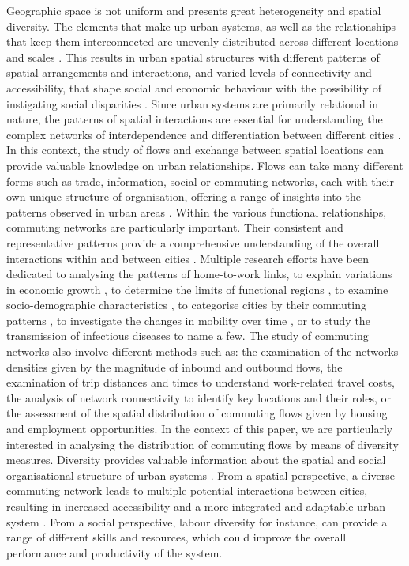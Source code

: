 \documentclass[11pt, a4paper]{article}
\begin{document}
Geographic space is not uniform and presents great heterogeneity and spatial diversity. The elements that make up urban systems, as well as the relationships that keep them interconnected are unevenly distributed across different locations and scales \citep{batty1994fractal,Bretagnolle2006, Pumain2006,Halas2014}. This results in urban spatial structures \citep{Sohn2005, Fusco2011} with different patterns of spatial arrangements and interactions, and varied levels of connectivity and accessibility, that shape social and economic behaviour with the possibility of instigating social disparities \citep{MaturanaMiranda2012,Burger2014}. Since urban systems are primarily relational in nature, the patterns of spatial interactions are essential for understanding the complex networks of interdependence and differentiation between different cities \citep{batty2018inventing}. In this context, the study of flows and exchange between spatial locations can provide valuable knowledge on urban relationships. Flows can take many different forms such as trade, information, social or commuting networks, each with their own unique structure of organisation, offering a range of insights into the patterns observed in urban areas \citep{Burger2014, Hesse2011,Fusco2011}. Within the various functional relationships, commuting networks are particularly important. Their consistent and representative patterns provide a comprehensive understanding of the overall interactions within and between cities \citep{Hanson1988,CLARK2003199}. Multiple research efforts have been dedicated to analysing the patterns of home-to-work links, to explain variations in economic growth \citep{Goetz2010}, to determine the limits of functional regions \citep{Kropp2014}, to examine socio-demographic characteristics \citep{Montis2007, Mare2019}, to categorise cities by their commuting patterns \citep{Louail2015}, to investigate the changes in mobility over time \citep{Patuelli2007,DeMontis2011,Louail2014}, or to study the transmission of infectious diseases \citep{Balcan2009} to name a few. The study of commuting networks also involve different methods such as: the examination of the networks densities given by the magnitude of inbound and outbound flows, the examination of trip distances and times to understand work-related travel costs, the analysis of network connectivity to identify key locations and their roles, or the assessment of the spatial distribution of commuting flows given by housing and employment opportunities. In the context of this paper, we are particularly interested in analysing the distribution of commuting flows by means of diversity measures. Diversity  provides valuable information about the spatial and social organisational structure of urban systems \citep{Lowe1998,Cheng2013,Pappalardo2016, Marin2022}. From a spatial perspective, a diverse commuting network leads to multiple potential interactions between cities, resulting in increased  accessibility and a more integrated and adaptable urban system \citep{Reggiani2010}. From a social perspective, labour diversity for instance, can provide a range of different skills and resources, which could improve the overall performance and productivity of the system.
\end{document}

